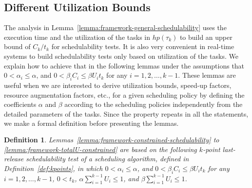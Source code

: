 \documentclass[10pt,conference]{IEEEtran}
\newtheorem{definition}{Definition}
\begin{document}
\subsection{Different Utilization Bounds}
The analysis in Lemma~\ref{lemma:framework-general-schedulability} uses the execution time and the utilization of the tasks in $hp(\tau_k)$ to build an upper bound of $C_k/t_k$ for  schedulability tests. It is also very convenient in real-time systems to build schedulability tests only based on utilization of the tasks. We explain how to achieve that in the following lemmas under the assumptions that $0 < \alpha_i \leq \alpha$, and $0 < \beta_i C_i \leq \beta U_i t_k$ for any $i=1,2,\ldots,k-1$. 
These lemmas are useful when we are interested to derive utilization bounds, speed-up factors, resource augmentation factors, etc., for a given scheduling policy by defining the coefficients $\alpha$ and $\beta$ according to the scheduling policies independently from the detailed parameters of the tasks. 
 Since the property repeats in all the statements, we make a formal definition before presenting the lemmas.
\begin{definition}
  \label{def:alpha-upper-bound}
  Lemmas~\ref{lemma:framework-constrained-schedulability} to
  \ref{lemma:framework-totalU-constrained} are based on the
  following $k$-point last-release schedulability test of a scheduling
  algorithm, defined in Definition~\ref{def:kpoints}, in which $0 <
  \alpha_i \leq \alpha$, and $0 < \beta_i C_i \leq \beta U_i t_k$ for
  any $i=1,2,\ldots,k-1$, $0 < t_k$, $\alpha\sum_{i=1}^{k-1}U_i \leq
  1$, and $\beta\sum_{i=1}^{k-1}U_i \leq 1$.
\end{definition}
\end{document}
